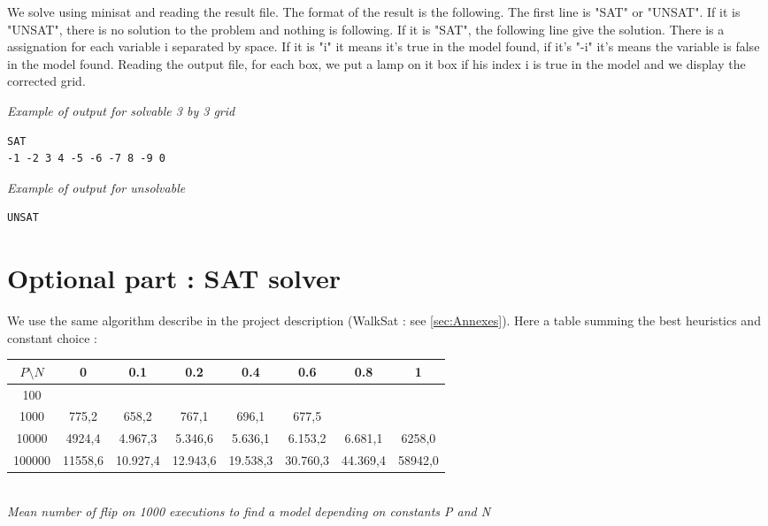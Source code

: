 \documentclass[a4paper]{article}
\begin{document}
We solve using minisat and reading the result file. The format of the result is the following.
The first line is "SAT" or "UNSAT".
If it is "UNSAT", there is no solution to the problem and nothing is following.
If it is "SAT", the following line give the solution. There is a assignation for each variable i separated by space. If it is "i" it means it's true in the model found, if it's "-i" it's means the variable is false in the model found.
Reading the output file, for each box, we put a lamp on it box if his index i is true in the model and we display the corrected grid.\newline

\textit{Example of output for solvable 3 by 3 grid}
\begin{verbatim}
SAT
-1 -2 3 4 -5 -6 -7 8 -9 0

\end{verbatim}

\textit{Example of output for unsolvable}
\begin{verbatim}
UNSAT

\end{verbatim}

\section{Optional part : SAT solver}

We use the same algorithm describe in the project description (WalkSat : see \ref{sec:Annexes}). Here a table summing the best heuristics and constant choice :
\begin{table}[h!]
\begin{center}
	\begin{tabular}{c||c c c c c c c}
         	$P \setminus N$ & 0  & 0.1  & 0.2  & 0.4  & 0.6 & 0.8 & 1  \\
        	\hline
        	\hline
     	    100 &  \cellcolor[gray]{0.5}   &   \cellcolor[gray]{0.5}   &     \cellcolor[gray]{0.5} &   \cellcolor[gray]{0.5}   &  \cellcolor[gray]{0.5}   & \cellcolor[gray]{0.5} &  \cellcolor[gray]{0.5} \\
     	   1000 & 775,2  & 658,2  & 767,1  & 696,1  & 677,5 & \cellcolor[gray]{0.5} &  \cellcolor[gray]{0.5} \\
    	  10000 & 4924,4  &  4.967,3  & 5.346,6 & 5.636,1   & 6.153,2 & 6.681,1 & 6258,0  \\
    	 100000 & 11558,6 & 10.927,4 & 12.943,6 & 19.538,3  & 30.760,3 &    44.369,4 & 58942,0  \\
      	\end{tabular}\\
      	\textit{Mean number of flip on 1000 executions to find a model depending on constants P and N}
\end{center}	
\end{table}
      	
\end{document}

